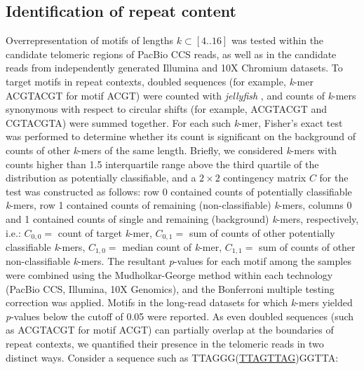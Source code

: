 \documentclass{article}
\begin{document}
\subsection*{Identification of repeat content}
    Overrepresentation of motifs of lengths $k \subset [4 .. 16]$ was tested within the candidate telomeric regions of PacBio CCS reads,
        as well as in the candidate reads from independently generated Illumina and 10X Chromium datasets.
    To target motifs in repeat contexts,
        doubled sequences (for example, \textit{k}-mer ACGTACGT for motif ACGT) were counted with \textit{jellyfish} \cite{jellyfish},
        and counts of \textit{k}-mers synonymous with respect to circular shifts (for example, ACGTACGT and CGTACGTA) were summed together.
    For each such \textit{k}-mer,
        Fisher's exact test was performed to determine whether its count is significant
            on the background of counts of other \textit{k}-mers of the same length.
    Briefly, we considered \textit{k}-mers with counts higher than 1.5 interquartile range above the third quartile of the distribution
        as potentially classifiable,
        and a $ 2 \times{} 2 $ contingency matrix $ C $ for the test was constructed as follows:
        row 0 contained counts of potentially classifiable \textit{k}-mers,
        row 1 contained counts of remaining (non-classifiable) \textit{k}-mers,
        columns 0 and 1 contained counts of single and remaining (background) \textit{k}-mers, respectively,
            i.e.:
                $ C_{0,0} = $ {\rmfamily count of target \textit{k}-mer},
                $ C_{0,1} = $ {\rmfamily sum of counts of other potentially classifiable \textit{k}-mers},
                $ C_{1,0} = $ {\rmfamily median count of \textit{k}-mer},
                $ C_{1,1} = $ {\rmfamily sum of counts of other non-classifiable \textit{k}-mers}.
    The resultant \textit{p}-values for each motif among the samples were combined using the Mudholkar-George method \cite{george}
        within each technology (PacBio CCS, Illumina, 10X Genomics),
        and the Bonferroni multiple testing correction was applied.
    Motifs in the long-read datasets for which \textit{k}-mers yielded \textit{p}-values below the cutoff of 0.05 were reported.
    As even doubled sequences (such as ACGTACGT for motif ACGT) can partially overlap at the boundaries of repeat contexts,
        we quantified their presence in the telomeric reads in two distinct ways.
        Consider a sequence such as TTAGGG(\underline{TTAGTTAG})GGTTA:
\end{document}
